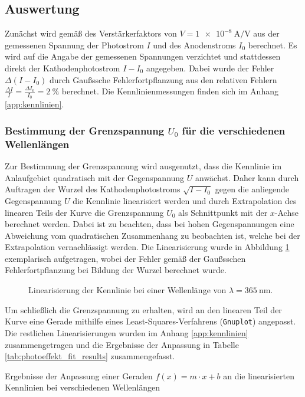 \documentclass[11pt, a4paper]{article}
\numberwithin{equation}{section}
\begin{document}
\subsection{Auswertung}
Zunächst wird gemäß des Verstärkerfaktors von $V = \SI{1e-8}{\ampere\per\volt}$ aus der gemessenen Spannung der Photostrom $I$ und des Anodenstroms $I_0$ berechnet.
Es wird auf die Angabe der gemessenen Spannungen verzichtet und stattdessen direkt der Kathodenphotostrom $I-I_0$ angegeben.
Dabei wurde der Fehler $\Delta (I - I_0)$ durch Gaußssche Fehlerfortpflanzung aus den relativen Fehlern $\frac{\Delta I}{I} = \frac{\Delta I_0}{I_0} = \SI{2}{\percent}$ berechnet.
Die Kennlinienmessungen finden sich im Anhang \ref{app:kennlinien}.



\subsubsection{Bestimmung der Grenzspannung $U_0$ für die verschiedenen Wellenlängen}
\label{sssec:photoeffekt_grenzspannung}
Zur Bestimmung der Grenzspannung wird ausgenutzt, dass die Kennlinie im Anlaufgebiet quadratisch mit der Gegenspannung $U$ anwächst.
Daher kann durch Auftragen der Wurzel des Kathodenphotostroms $\sqrt{I-I_0}$ gegen die anliegende Gegenspannung $U$ die Kennlinie linearisiert werden und durch Extrapolation des linearen Teils der Kurve die Grenzspannung $U_0$ als Schnittpunkt mit der $x$-Achse berechnet werden.
Dabei ist zu beachten, dass bei hohen Gegenspannungen eine Abweichung vom quadratischen Zusammenhang zu beobachten ist, welche bei der Extrapolation vernachlässigt werden.
Die Linearisierung wurde in Abbildung \ref{fig:kennlinien_exemp_365nm} exemplarisch aufgetragen, wobei der Fehler gemäß der Gaußsschen Fehlerfortpflanzung bei Bildung der Wurzel berechnet wurde.
\begin{figure}[h]
	\centering
	
	\caption{Linearisierung der Kennlinie bei einer Wellenlänge von $\lambda = \SI{365}{\nano\metre}$. }
	\label{fig:kennlinien_exemp_365nm}
\end{figure}
Um schließlich die Grenzspannung zu erhalten, wird an den linearen Teil der Kurve eine Gerade mithilfe eines Least-Squares-Verfahrens (\texttt{Gnuplot}) angepasst.
Die restlichen Linearisierungen wurden im Anhang \ref{app:kennlinien} zusammengetragen und die Ergebnisse der Anpassung in Tabelle \ref{tab:photoeffekt_fit_results} zusammengefasst.
\begin{table}[h]
	\centering
	
	\caption{Ergebnisse der Anpassung einer Geraden $f(x) = m \cdot x + b$ an die linearisierten Kennlinien bei verschiedenen Wellenlängen}
	\label{tab:photoeffekt_fit_results}
\end{table}
\end{document}

